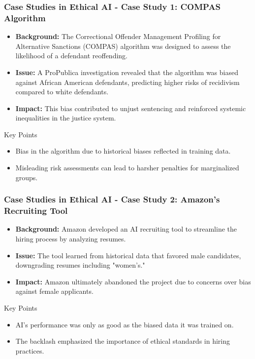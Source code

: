 \documentclass{beamer}
\begin{document}
\begin{frame}[fragile]
    \frametitle{Case Studies in Ethical AI - Case Study 1: COMPAS Algorithm}
    \begin{itemize}
        \item \textbf{Background:} The Correctional Offender Management Profiling for Alternative Sanctions (COMPAS) algorithm was designed to assess the likelihood of a defendant reoffending.
        \item \textbf{Issue:} A ProPublica investigation revealed that the algorithm was biased against African American defendants, predicting higher risks of recidivism compared to white defendants.
        \item \textbf{Impact:} This bias contributed to unjust sentencing and reinforced systemic inequalities in the justice system.
    \end{itemize}
    \begin{block}{Key Points}
        \begin{itemize}
            \item Bias in the algorithm due to historical biases reflected in training data.
            \item Misleading risk assessments can lead to harsher penalties for marginalized groups.
        \end{itemize}
    \end{block}
\end{frame}

\begin{frame}[fragile]
    \frametitle{Case Studies in Ethical AI - Case Study 2: Amazon's Recruiting Tool}
    \begin{itemize}
        \item \textbf{Background:} Amazon developed an AI recruiting tool to streamline the hiring process by analyzing resumes.
        \item \textbf{Issue:} The tool learned from historical data that favored male candidates, downgrading resumes including "women's."
        \item \textbf{Impact:} Amazon ultimately abandoned the project due to concerns over bias against female applicants.
    \end{itemize}
    \begin{block}{Key Points}
        \begin{itemize}
            \item AI's performance was only as good as the biased data it was trained on.
            \item The backlash emphasized the importance of ethical standards in hiring practices.
        \end{itemize}
    \end{block}
\end{frame}
\end{document}
